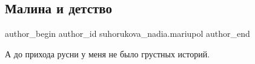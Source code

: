  
 
 
 
 
 
\subsection{Малина и детство}
\label{sec:26_02_2023.tg.suhorukova_nadia.mariupol.1.malina_i_detstvo}
 
\ifcmt
 author_begin
   author_id suhorukova_nadia.mariupol
 author_end
\fi



А до прихода русни у меня не было грустных историй. 


